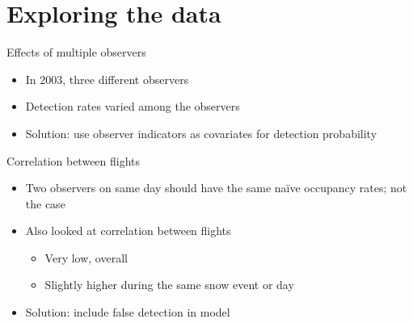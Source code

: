 \documentclass{beamer}
\begin{document}
\section{Exploring the data}
\begin{frame}{Effects of multiple observers}
	\begin{itemize}
		\item In 2003, three different observers
		\item Detection rates varied among the observers
	\end{itemize}
	\begin{center}
	\end{center}
	\begin{itemize}
		\item Solution: use observer indicators as covariates for detection 
		probability
	\end{itemize}
\end{frame}

\begin{frame}{Correlation between flights}
	\begin{itemize}
		\item Two observers on same day should have the same na\"ive occupancy 
		rates; not the case
		\item Also looked at correlation between flights
		\begin{itemize}
			\item Very low, overall
			\item Slightly higher during the same snow event or day
		\end{itemize}
		\item Solution: include false detection in model
	\end{itemize}
\end{frame}
\end{document}
